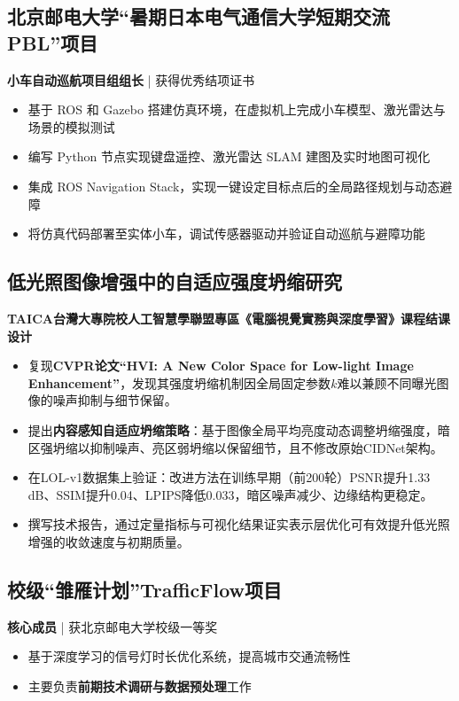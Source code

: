 \documentclass[11pt, a4paper]{article}
\newenvironment{tightemize}{
    \begin{itemize}[leftmargin=*, nosep]
    \setlength{\itemsep}{3pt}
    \setlength{\parskip}{0pt}
}{\end{itemize}}
\begin{document}
\vspace{0.22cm}

\subsection{北京邮电大学“暑期日本电气通信大学短期交流PBL”项目}
\textbf{小车自动巡航项目组组长} | 获得优秀结项证书
\begin{tightemize}
\item 基于 ROS 和 Gazebo 搭建仿真环境，在虚拟机上完成小车模型、激光雷达与场景的模拟测试
\item 编写 Python 节点实现键盘遥控、激光雷达 SLAM 建图及实时地图可视化
\item 集成 ROS Navigation Stack，实现一键设定目标点后的全局路径规划与动态避障
\item 将仿真代码部署至实体小车，调试传感器驱动并验证自动巡航与避障功能
\end{tightemize}

\vspace{0.22cm}

\subsection*{低光照图像增强中的自适应强度坍缩研究}
\textbf{TAICA台灣大專院校人工智慧學聯盟專區《電腦視覺實務與深度學習》课程结课设计}
\begin{tightemize}
    \item 复现\textbf{CVPR论文“HVI: A New Color Space for Low-light Image Enhancement”}，发现其强度坍缩机制因全局固定参数\(k\)难以兼顾不同曝光图像的噪声抑制与细节保留。
    \item 提出\textbf{内容感知自适应坍缩策略}：基于图像全局平均亮度动态调整坍缩强度，暗区强坍缩以抑制噪声、亮区弱坍缩以保留细节，且不修改原始CIDNet架构。
    \item 在LOL-v1数据集上验证：改进方法在训练早期（前200轮）PSNR提升1.33 dB、SSIM提升0.04、LPIPS降低0.033，暗区噪声减少、边缘结构更稳定。
    \item 撰写技术报告，通过定量指标与可视化结果证实表示层优化可有效提升低光照增强的收敛速度与初期质量。
\end{tightemize}

\vspace{0.22cm}

\subsection{校级“雏雁计划”TrafficFlow项目}
\textbf{核心成员} | 获北京邮电大学校级一等奖
\begin{tightemize}
    \item 基于深度学习的信号灯时长优化系统，提高城市交通流畅性
    \item 主要负责\textbf{前期技术调研与数据预处理}工作
\end{tightemize}
\end{document}
